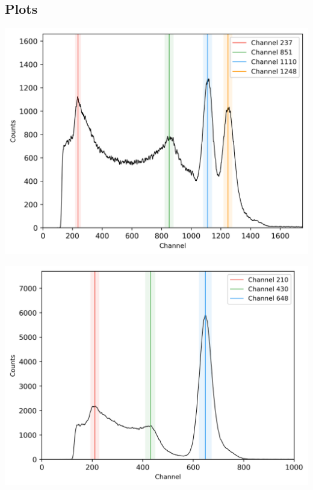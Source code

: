 \subsection{Plots}
%
\begin{center}
    \begin{adjustbox}{max width=\linewidth, keepaspectratio}
        \includegraphics[]{png/60Co}
    \end{adjustbox}
    \label{fig:}
\end{center}
%
\begin{center}
    \begin{adjustbox}{max width=\linewidth, keepaspectratio}
        \includegraphics[]{png/137Cs}
    \end{adjustbox}
    \label{fig:}
\end{center}
